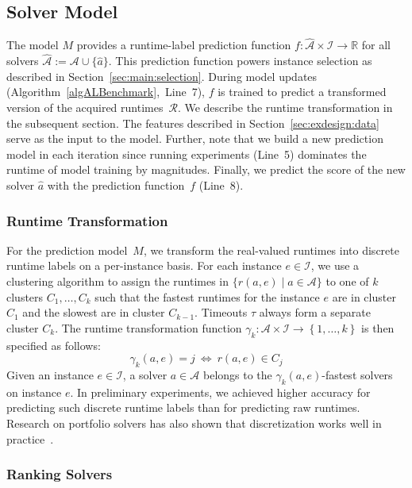 \documentclass[sn-basic, Numbered]{sn-jnl} %
\begin{document}
\subsection{Solver Model}
\label{sec:main:model}

The model $M$ provides a runtime-label prediction function $f : \mathcal{\hat A} \times \mathcal{I} \rightarrow \mathbb{R}$ for all solvers $\mathcal{\hat A} := \mathcal{A} \cup \lbrace \hat a \rbrace$.
This prediction function powers instance selection as described in Section~\ref{sec:main:selection}.
During model updates (Algorithm~\ref{algALBenchmark},~Line~7), $f$ is trained to predict a transformed version of the acquired runtimes~$\mathcal{R}$.
We describe the runtime transformation in the subsequent section.
The features described in Section~\ref{sec:exdesign:data} serve as the input to the model.
Further, note that we build a new prediction model in each iteration since running experiments (Line~5) dominates the runtime of model training by magnitudes.
Finally, we predict the score of the new solver $\hat a$ with the prediction function~$f$ (Line~8).

\subsubsection{Runtime Transformation}

For the prediction model~$M$, we transform the real-valued runtimes into discrete runtime labels on a per-instance basis.
For each instance $e \in \mathcal{I}$, we use a clustering algorithm to assign the runtimes in $\bigl\{ r(a, e) \mid a \in \mathcal{A} \bigr\}$ to one of $k$ clusters $C_1, \dots, C_k$ such that the fastest runtimes for the instance $e$ are in cluster $C_1$ and the slowest are in cluster $C_{k-1}$.
Timeouts $\tau$ always form a separate cluster $C_{k}$.
The runtime transformation function $\gamma_k : {\mathcal{A} \times \mathcal{I}} \rightarrow \left\lbrace 1, \dots, k \right\rbrace$ is then specified as follows:
%
$$\gamma_k(a, e) = j ~\Leftrightarrow~ r(a, e) \in C_j$$
%
Given an instance $e \in \mathcal{I}$, a solver $a \in \mathcal{A}$ belongs to the $\gamma_k(a, e)$-fastest solvers on instance $e$. 
In preliminary experiments, we achieved higher accuracy for predicting such discrete runtime labels than for predicting raw runtimes.
Research on portfolio solvers has also shown that discretization works well in practice~\cite{CollauttiMMO13,NgokoCT19}.

\subsubsection{Ranking Solvers}
\end{document}
